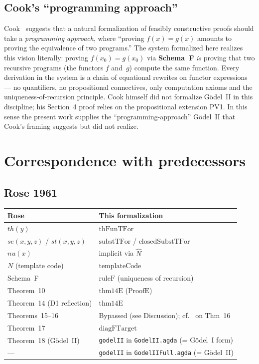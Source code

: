 \documentclass[11pt]{article}
\newcommand{\SchemaF}{\textbf{Schema~F}}
\newcommand{\thFunTFor}{\mathrm{thFunTFor}}
\begin{document}
\subsection*{Cook's ``programming approach''}

Cook~\cite[Section~8]{cook1975} suggests that a natural
formalization of feasibly constructive proofs should take a
\emph{programming approach}, where ``proving $f(x) = g(x)$
amounts to proving the equivalence of two programs.''
The system formalized here realizes this vision literally:
proving $f(x_0) = g(x_0)$ via \SchemaF{} \emph{is} proving
that two recursive programs (the functors $f$ and~$g$)
compute the same function.  Every derivation in the system
is a chain of equational rewrites on functor expressions ---
no quantifiers, no propositional connectives, only
computation axioms and the uniqueness-of-recursion principle.
Cook himself did not formalize G\"odel~II in this discipline;
his Section~4 proof relies on the propositional extension
PV1.  In this sense the present work supplies the
``programming-approach'' G\"odel~II that Cook's framing
suggests but did not realize.

\section{Correspondence with predecessors}

\subsection*{Rose 1961}

\begin{center}
\begin{tabular}{ll}
\hline
\textbf{Rose~\cite{rose1961}} & \textbf{This formalization} \\
\hline
$th(y)$ & $\thFunTFor$ \\
$se(x,y,z)$ / $st(x,y,z)$ & $\mathrm{substTFor}$ / $\mathrm{closedSubstTFor}$ \\
$nu(x)$ & implicit via $\hat{N}$ \\
$N$ (template code) & $\mathrm{templateCode}$ \\
Schema~F & $\mathrm{ruleF}$ (uniqueness of recursion) \\
Theorem~10 & $\mathrm{thm14E}$ ($\mathrm{ProofE}$) \\
Theorem~14 (D1 reflection) & $\mathrm{thm14E}$ \\
Theorems~15--16 & Bypassed (see Discussion); cf.~\cite{cook1975} on Thm~16 \\
Theorem~17 & $\mathrm{diagFTarget}$ \\
Theorem~18 (G\"odel~II) & \texttt{godelII} in \texttt{GodelII.agda} (= G\"odel~I form) \\
--- & \texttt{godelII} in \texttt{GodelIIFull.agda} (= G\"odel~II) \\
\hline
\end{tabular}
\end{center}
\end{document}
